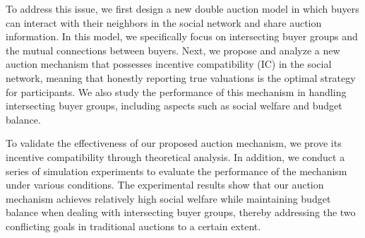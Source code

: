 To address this issue, we first design a new double auction model in which buyers can interact with their neighbors in the social network and share auction information. In this model, we specifically focus on intersecting buyer groups and the mutual connections between buyers. Next, we propose and analyze a new auction mechanism that possesses incentive compatibility (IC) in the social network, meaning that honestly reporting true valuations is the optimal strategy for participants. We also study the performance of this mechanism in handling intersecting buyer groups, including aspects such as social welfare and budget balance.

To validate the effectiveness of our proposed auction mechanism, we prove its incentive compatibility through theoretical analysis. In addition, we conduct a series of simulation experiments to evaluate the performance of the mechanism under various conditions. The experimental results show that our auction mechanism achieves relatively high social welfare while maintaining budget balance when dealing with intersecting buyer groups, thereby addressing the two conflicting goals in traditional auctions to a certain extent.
